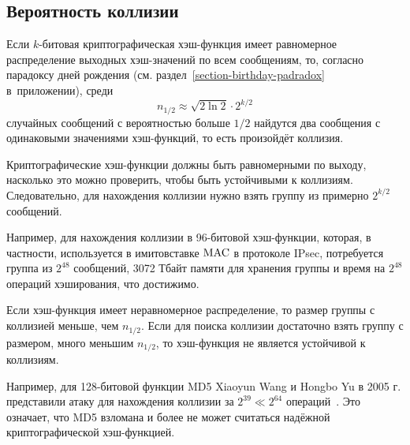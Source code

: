 \subsection{Вероятность коллизии}

Если $k$-битовая криптографическая хэш-функция имеет равномерное распределение выходных хэш-значений по всем сообщениям, то, согласно парадоксу дней рождения (см. раздел~\ref{section-birthday-padradox} в~приложении), среди
    \[ n_{1/2} \approx \sqrt{2 \ln 2} \cdot 2^{k/2} \]
случайных сообщений с вероятностью больше $1/2$ найдутся два сообщения с одинаковыми значениями хэш-функций, то есть произойдёт коллизия.

Криптографические хэш-функции должны быть равномерными по выходу, насколько это можно проверить, чтобы быть устойчивыми к коллизиям. Следовательно, для нахождения коллизии нужно взять группу из примерно $2^{k/2}$ сообщений.

Например, для нахождения коллизии в 96-битовой хэш-функции, которая, в частности, используется в имитовставке $\textrm{MAC}$ в протоколе IPsec, потребуется группа из $2^{48}$ сообщений, 3072 Тбайт памяти для хранения группы и время на $2^{48}$ операций хэширования, что достижимо.

Если хэш-функция имеет неравномерное распределение, то размер группы с коллизией меньше, чем $n_{1/2}$. Если для поиска коллизии достаточно взять группу с размером, много меньшим $n_{1/2}$, то хэш-функция не является устойчивой к коллизиям.

Например, для 128-битовой функции MD5 Xiaoyun Wang и Hongbo Yu в 2005 г. представили атаку для нахождения коллизии за $2^{39} \ll 2^{64}$ операций~\cite{WangYu:2005}. Это означает, что MD5 взломана и более не может считаться надёжной криптографической хэш-функцией.
